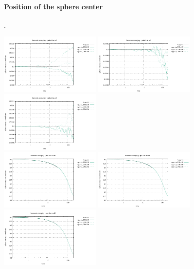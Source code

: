 \paragraph{Position of the sphere center}.
\begin{center}
\includegraphics[width=5cm]{images/stokes_sphere_fs2D/center_position_x_arithm_pic.pdf}
\includegraphics[width=5cm]{images/stokes_sphere_fs2D/center_position_x_geom_pic.pdf}
\includegraphics[width=5cm]{images/stokes_sphere_fs2D/center_position_x_harm_pic.pdf}\\
\includegraphics[width=5cm]{images/stokes_sphere_fs2D/center_position_y_arithm_pic.pdf}
\includegraphics[width=5cm]{images/stokes_sphere_fs2D/center_position_y_geom_pic.pdf}
\includegraphics[width=5cm]{images/stokes_sphere_fs2D/center_position_y_harm_pic.pdf}\\
\end{center}

